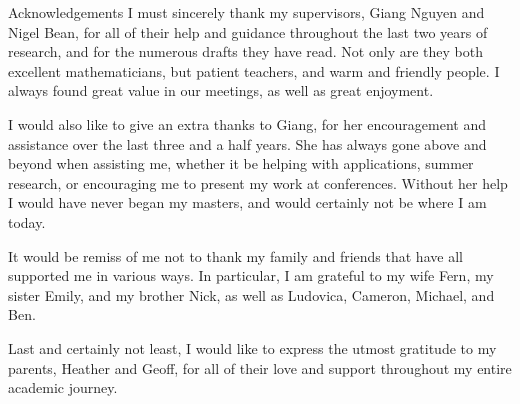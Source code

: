 
\begin{chapter}{Acknowledgements}
\label{ch:acknowledgements}
I must sincerely thank my supervisors, Giang Nguyen and Nigel Bean, for all of their help and guidance throughout the last two years of research, and for the numerous drafts they have read.
Not only are they both excellent mathematicians, but patient teachers, and warm and friendly people.
I always found great value in our meetings, as well as great enjoyment.

I would also like to give an extra thanks to Giang, for her encouragement and assistance over the last three and a half years.
She has always gone above and beyond when assisting me, whether it be helping with applications, summer research, or encouraging me to present my work at conferences.
Without her help I would have never began my masters, and would certainly not be where I am today.

It would be remiss of me not to thank my family and friends that have all supported me in various ways.
In particular, I am grateful to my wife Fern, my sister Emily, and my brother Nick, as well as Ludovica, Cameron, Michael, and Ben.

Last and certainly not least, I would like to express the utmost gratitude to my parents, Heather and Geoff, for all of their love and support throughout my entire academic journey. 
\end{chapter}

